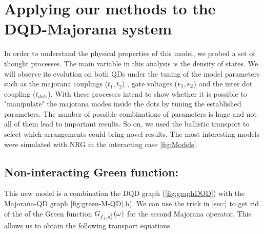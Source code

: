 \section{Applying our methods to the DQD-Majorana system}


In order to understand the physical properties of this model, we probed a set of thought processes. The main variable in this analysis is the density of states.  We  will observe its evolution on both QDs under the tuning of the model parameters such as the majorana couplings ($t_1 , t_2$)  ,  gate voltages ($\epsilon_{1} , \epsilon_{2} $) and the inter dot coupling ($t_{dots}$). With these processes intend to show whether it is possible to "manipulate" the majorana modes inside the dots by tuning the established parameters. The number of possible combinations of parameters is huge and not all of them lead to important results. So on, we used the ballistic transport to select which arrangements could bring novel results. The most interesting models were simulated with NRG in the interacting case \ref{fig:Models}.  

\subsection{Non-interacting Green function:}

This new model is a combination the DQD graph (\ref{fig:graphDQD}) with the Majorana-QD graph \ref{fig:green-M-QD}.b). We can use the trick in \ref{sec:} to get rid of the of the Green function $G_{f_\downarrow,d^\dagger_1}(\omega)$ for the second Majorana operator. This allows us to obtain the following transport equations 
 
 
 
 
